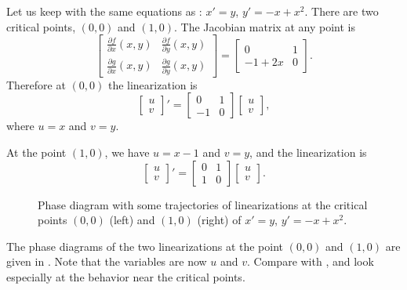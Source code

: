 \begin{example} \label{example:nlin-1b-examplelin}
Let us keep with the same equations as :
$x' = y$, $y' = -x+x^2$.  There are two critical points, $(0,0)$
and $(1,0)$.  The Jacobian matrix at any point is
\begin{equation*}
\begin{bmatrix}
\frac{\partial f}{\partial x}(x,y) &
\frac{\partial f}{\partial y}(x,y) \\
\frac{\partial g}{\partial x}(x,y) &
\frac{\partial g}{\partial y}(x,y)
\end{bmatrix} =
\begin{bmatrix}
0 & 1 \\
-1+2x & 0
\end{bmatrix}.
\end{equation*}
Therefore at $(0,0)$ the linearization is
\begin{equation*}
\begin{bmatrix} u \\ v \end{bmatrix} ' =
\begin{bmatrix}
0 & 1 \\
-1 & 0
\end{bmatrix}
\begin{bmatrix} u \\ v \end{bmatrix} ,
\end{equation*}
where $u=x$ and $v=y$.

At the point $(1,0)$, we have $u=x-1$ and $v=y$, and the linearization is
\begin{equation*}
\begin{bmatrix} u \\ v \end{bmatrix} ' =
\begin{bmatrix}
0 & 1 \\
1 & 0
\end{bmatrix}
\begin{bmatrix} u \\ v \end{bmatrix} .
\end{equation*}

\begin{figure}[h!t]
\capstart
\begin{center}
\caption{Phase diagram with some trajectories of
linearizations at the critical points $(0,0)$ (left) and $(1,0)$ (right) of
$x' = y$, $y' = -x+x^2$. \label{fig:nlin-1b-lin}}
\end{center}
\end{figure}

The phase diagrams of the two linearizations at the
point $(0,0)$ and $(1,0)$ are given in .  Note
that the variables are now $u$ and $v$.  Compare
 with , and look especially at the
behavior near the critical points.
\end{example}


